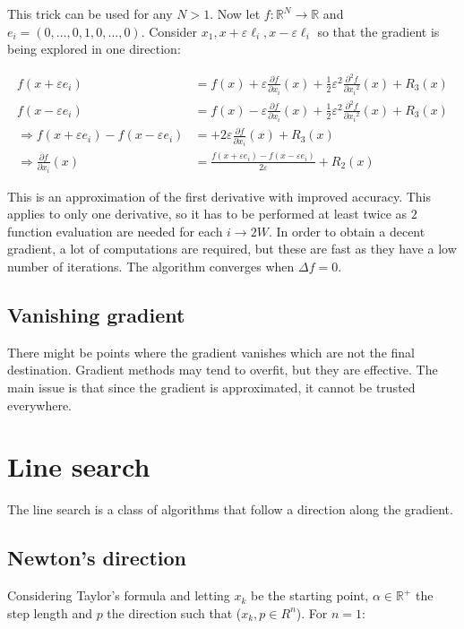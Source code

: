 This trick can be used for any $N>1$.
Now let $f: \mathbb{R}^N \rightarrow \mathbb{R}$ and $e_i=(0, \ldots, 0,1,0,\ldots,0)$.
Consider $x_1, x+\varepsilon \ell_i, x-\varepsilon \ell_i$ so that the gradient is being explored in one direction:

\begin{align*}
  f\left(x+\varepsilon e_i\right)&=f(x)+\varepsilon \frac{\partial f}{\partial x_i}(x)+\frac{1}{2} \varepsilon^2 \frac{\partial^2 f}{\partial x_i{ }^2}(x)+R_3(x) \\
  f\left(x-\varepsilon e_i\right)&=f(x)-\varepsilon \frac{\partial f}{\partial x_i}(x)+\frac{1}{2} \varepsilon^2 \frac{\partial^2 f}{\partial x_i{ }^2}(x)+R_3(x) \\
  \Rightarrow f\left(x+\varepsilon e_i\right)-f\left(x-\varepsilon e_i\right)&=+2 \varepsilon \frac{\partial f}{\partial x_i}(x)+R_3(x) \\
  \Rightarrow \frac{\partial f}{\partial x_i}(x)&=\frac{f\left(x+\varepsilon e_i\right)-f\left(x-\varepsilon e_i\right)}{2 \varepsilon}+R_2(x)
\end{align*}

This is an approximation of the first derivative with improved accuracy.
This applies to only one derivative, so it has to be performed at least twice as $2$ function evaluation are needed for each $i\rightarrow 2W$.
In order to obtain a decent gradient, a lot of computations are required, but these are fast as they have a low number of iterations.
The algorithm converges when $\Delta f = 0$.

  \subsection{Vanishing gradient}
  There might be points where the gradient vanishes which are not the final destination.
  Gradient methods may tend to overfit, but they are effective.
  The main issue is that since the gradient is approximated, it cannot be trusted everywhere.

\section{Line search}
The line search is a class of algorithms that follow a direction along the gradient.

  \subsection{Newton's direction}
  Considering Taylor's formula and letting $x_k$ be the starting point, $\alpha \in \mathbb{R}^+$ the step length and $p$ the direction such that ($x_k, p \in R^n$).
  For $n=1$:

